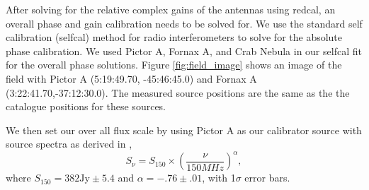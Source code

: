 \documentclass[twocolumn,numberedappendix]{emulateapj} \shorttitle{PSA64}
\begin{document}
After solving for the relative complex gains of the antennas using redcal, an
overall phase and gain calibration needs to be solved for. We use the standard self
calibration (selfcal) method for radio interferometers to solve for the absolute
phase calibration. We used Pictor A, Fornax A, and Crab Nebula in our selfcal
fit for the overall phase solutions. Figure \ref{fig:field_image} shows an image
of the field with Pictor A (5:19:49.70, -45:46:45.0)  and Fornax A
(3:22:41.70,-37:12:30.0). The measured source positions are the same as the the
catalogue positions for these sources.



%      
%
%

We then set our over all flux scale by using Pictor A as our calibrator source
with source spectra as derived in \cite{jacobs_et_al2013}, 
\begin{equation}
    S_{\nu} = S_{150}\times\left(\frac{\nu}{150MHz}\right)^{\alpha},
\end{equation}
where $S_{150} = 382 \text{Jy} \pm 5.4$ and $\alpha = -.76 \pm .01$, with
1$\sigma$ error bars.


\end{document}
